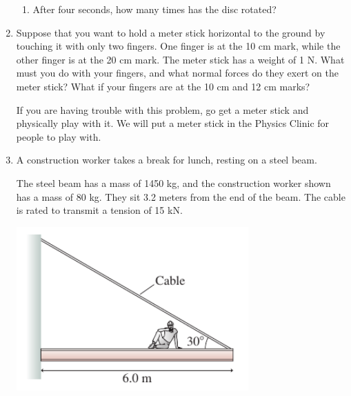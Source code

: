 \documentclass[12pt]{article}
\begin{document}
\begin{enumerate}
\begin{enumerate}
		\item After four seconds, how many times has the disc rotated?
		
%		
	\end{enumerate}

	\bigskip
	\bigskip
	
	\item Suppose that you want to hold a meter stick horizontal to the ground by touching it
	with only two fingers. One finger is at the 10 cm mark, while the other finger is at the
	20 cm mark. The meter stick has a weight of 1 N. What must you do with your fingers,
	and what normal forces do they exert on the meter stick?
	What if your fingers are at the 10 cm and 12 cm marks?
	
	If you are having trouble
	with this problem, go get a meter stick and physically play with it. We will put a meter stick in the Physics Clinic for people to play with.
	\bigskip
	\bigskip
	\newpage
	
	 \item A construction worker takes a break for lunch, resting on a steel beam.
	
	\begin{minipage}{0.5\textwidth}
		The steel
		beam has a mass of 1450 kg, and the construction worker shown has a mass of 80 kg. They sit
		3.2 meters from the end of the beam. The cable is rated to transmit a tension of 15 kN.
	\end{minipage}
	\begin{minipage}{0.5\textwidth}
		\begin{center}
			\includegraphics[width=0.7\textwidth]{person-on-girder.png}
		\end{center}
	\end{minipage}
	

\end{enumerate}
\end{document}
